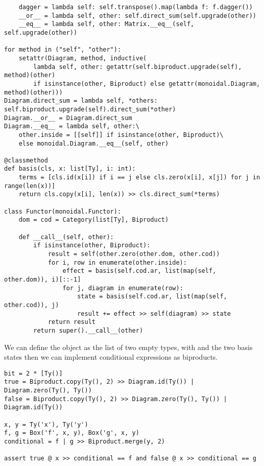\begin{python}
\begin{verbatim}
    dagger = lambda self: self.transpose().map(lambda f: f.dagger())
    __or__ = lambda self, other: self.direct_sum(self.upgrade(other))
    __eq__ = lambda self, other: Matrix.__eq__(self, self.upgrade(other))

for method in ("self", "other"):
    setattr(Diagram, method, inductive(
        lambda self, other: getattr(self.biproduct.upgrade(self), method)(other)
        if isinstance(other, Biproduct) else getattr(monoidal.Diagram, method)(other)))
Diagram.direct_sum = lambda self, *others: self.biproduct.upgrade(self).direct_sum(*other)
Diagram.__or__ = Diagram.direct_sum
Diagram.__eq__ = lambda self, other:\
    other.inside = [[self]] if isinstance(other, Biproduct)\
    else monoidal.Diagram.__eq__(self, other)

@classmethod
def basis(cls, x: list[Ty], i: int):
    terms = [cls.id(x[i]) if i == j else cls.zero(x[i], x[j]) for j in range(len(x))]
    return cls.copy(x[i], len(x)) >> cls.direct_sum(*terms)

class Functor(monoidal.Functor):
    dom = cod = Category(list[Ty], Biproduct)

    def __call__(self, other):
        if isinstance(other, Biproduct):
            result = self(other.zero(other.dom, other.cod))
            for i, row in enumerate(other.inside):
                effect = basis(self.cod.ar, list(map(self, other.dom)), i)[::-1]
                for j, diagram in enumerate(row):
                    state = basis(self.cod.ar, list(map(self, other.cod)), j)
                    result += effect >> self(diagram) >> state
            return result
        return super().__call__(other)
\end{verbatim}
\end{python}

\begin{example}
We can define the object  as the list of two empty types, with  and  the two basis states
then we can implement conditional expressions as biproducts.

\begin{verbatim}
bit = 2 * [Ty()]
true = Biproduct.copy(Ty(), 2) >> Diagram.id(Ty()) | Diagram.zero(Ty(), Ty())
false = Biproduct.copy(Ty(), 2) >> Diagram.zero(Ty(), Ty()) | Diagram.id(Ty())

x, y = Ty('x'), Ty('y')
f, g = Box('f', x, y), Box('g', x, y)
conditional = f | g >> Biproduct.merge(y, 2)

assert true @ x >> conditional == f and false @ x >> conditional == g
\end{verbatim}
\end{example}

